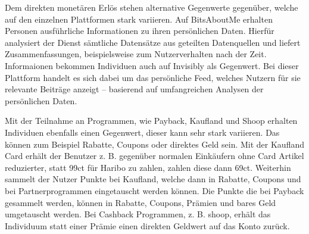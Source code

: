 \noindent Dem direkten monetären Erlös stehen alternative Gegenwerte gegenüber, welche auf den einzelnen Plattformen stark variieren. Auf BitsAboutMe erhalten Personen ausführliche Informationen zu ihren persönlichen Daten. Hierfür analysiert der Dienst sämtliche Datensätze aus geteilten Datenquellen und liefert Zusammenfassungen, beispielsweise zum Nutzerverhalten nach der Zeit. Informaionen bekommen Individuen auch auf Invisibly als Gegenwert. Bei dieser Plattform handelt es sich dabei um das persönliche Feed, welches Nutzern für sie relevante Beiträge anzeigt -- basierend auf umfangreichen Analysen der persönlichen Daten. \newline

\noindent Mit der Teilnahme an Programmen, wie Payback, Kaufland und Shoop erhalten Individuen ebenfalls einen Gegenwert, dieser kann sehr stark variieren. Das können zum Beispiel Rabatte, Coupons oder direktes Geld sein. 
Mit der Kaufland Card erhält der Benutzer z. B. gegenüber normalen Einkäufern ohne Card Artikel reduzierter, statt 99ct für Haribo zu zahlen, zahlen diese dann 69ct. Weiterhin sammelt der Nutzer Punkte bei Kaufland, welche dann in Rabatte, Coupons und bei Partnerprogrammen eingetauscht werden können. Die Punkte die bei Payback gesammelt werden, können in Rabatte, Coupons, Prämien und bares Geld umgetauscht werden.
Bei Cashback Programmen, z. B. shoop, erhält das Individuum statt einer Prämie einen direkten Geldwert auf das Konto zurück. 

